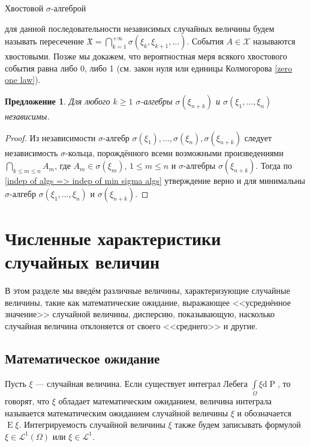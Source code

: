 \documentclass[12pt]{article}
\newtheorem{proposition}[theorem]{Предложение}
\numberwithin{theorem}{section}
\theoremstyle{definition}
\newcommand{\defin}[2]{\hypertarget{#2}{{\color{red} #1}}}
\newcommand{\prob}{\operatorname{P}}
\newcommand{\expect}{\operatorname{E}}
\newcommand{\diff}{\mathrm{d}}
\begin{document}
	\defin{Хвостовой $ \sigma $-алгеброй}{tail-sigma-algebra} для данной последовательности независимых случайных величины 
	будем называть пересечение $ \mathfrak{X} = \bigcap\limits_{k = 1}^{+\infty} \sigma(\xi_k, \xi_{k + 1}, \ldots) $.
	События $ A \in \mathcal{X} $ называются \defin{хвостовыми}{tail-event}.
	Позже мы докажем, что вероятностная меря всякого хвостового события равна либо 0, либо 1
	(см. закон нуля или единицы Колмогорова \ref{zero one law}).
	
	\begin{proposition} \label{independence of past}
		Для любого $ k \geqslant 1 $ $ \sigma $-алгебры $ \sigma(\xi_{n + k}) $
		и $ \sigma(\xi_1, \ldots, \xi_n) $ независимы.
	\end{proposition}
	
	\begin{proof}
		Из независимости $ \sigma $-алгебр $ \sigma(\xi_1), \ldots, \sigma(\xi_n), \sigma(\xi_{n + k}) $
		следует независимость $ \sigma $-кольца, порождённого всеми возможными произведениями
		$ \bigcap\limits_{k \leqslant m \leqslant n} A_m $, где $ A_m \in \sigma(\xi_m) $, $ 1 \leqslant m \leqslant n $
		и $ \sigma $-алгебры $ \sigma(\xi_{n + k}) $.
		Тогда по \ref{indep of algs => indep of min sigma algs} утверждение верно и для минимальны $ \sigma $-алгебр
		$ \sigma(\xi_1, \ldots, \xi_n) $ и $ \sigma(\xi_{n + k}) $.	
	\end{proof}
	
	\section{Численные характеристики случайных величин}
	
	В этом разделе мы введём различные величины, характеризующие случайные величины,
	такие как математические ожидание, выражающее <<усреднённое значение>> случайной величины,
	дисперсию, показывающую, насколько случайная величина отклоняется от своего <<среднего>>
	и другие.
	
	\subsection{Математическое ожидание}
	
	Пусть $ \xi $ --- случайная величина. Если существует интеграл Лебега $ \int\limits_{\Omega} \xi \diff\prob $,
	то говорят, что $ \xi $ \defin{обладает математическим ожиданием}{has-expectation}, 
	величина интеграла называется \defin{математическим ожиданием случайной величины $ \xi $}{mathematical-expectation}
	и обозначается $ \expect\xi $.
	Интегрируемость случайной величины $ \xi $ также будем записывать формулой $ \xi \in \mathcal{L}^1(\Omega) $
	или $ \xi \in \mathcal{L}^1 $.
	
\end{document}
